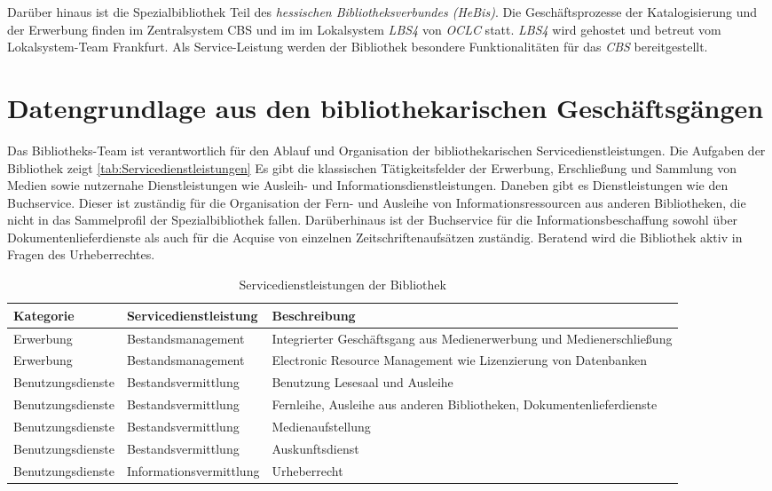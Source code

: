 Darüber hinaus ist die Spezialbibliothek Teil des \textit{hessischen Bibliotheksverbundes (HeBis)}. Die Geschäftsprozesse
der Katalogisierung und der Erwerbung finden im Zentralsystem \acrlong{CBS} und im im Lokalsystem \textit{LBS4} von
\textit{OCLC} statt. \textit{LBS4} wird gehostet und betreut vom Lokalsystem-Team Frankfurt. Als Service-Leistung werden der Bibliothek besondere Funktionalitäten
für das \textit{CBS} bereitgestellt.

\clearpage

\section{Datengrundlage aus den bibliothekarischen Geschäftsgängen}
Das Bibliotheks-Team ist verantwortlich für den Ablauf und Organisation der bibliothekarischen Servicedienstleistungen.
Die Aufgaben der Bibliothek zeigt \autoref{tab:Servicedienstleistungen}
Es gibt die klassischen Tätigkeitsfelder der Erwerbung, Erschließung und Sammlung von Medien sowie nutzernahe Dienstleistungen wie Ausleih- und Informationsdienstleistungen. 
Daneben gibt es Dienstleistungen wie den Buchservice. Dieser ist zuständig für die Organisation der Fern- und Ausleihe von Informationsressourcen aus anderen Bibliotheken, die nicht
in das Sammelprofil der Spezialbibliothek fallen. Darüberhinaus ist der Buchservice für die Informationsbeschaffung sowohl über Dokumentenlieferdienste als auch für die Acquise von einzelnen Zeitschriftenaufsätzen zuständig.
Beratend wird die Bibliothek aktiv in Fragen des Urheberrechtes. 

\begin{table}[h]
    \centering
    \begin{adjustbox}{max width=\textwidth}
    \begin{tabular}{lll}
       \toprule
       \textbf{Kategorie}& \textbf{Servicedienstleistung}& \textbf{Beschreibung}\\
       \midrule     
        Erwerbung                   &Bestandsmanagement      &Integrierter Geschäftsgang aus Medienerwerbung und Medienerschließung\\
        Erwerbung                   &Bestandsmanagement      &Electronic Resource Management wie Lizenzierung von Datenbanken\\
        Benutzungsdienste           &Bestandsvermittlung     &Benutzung Lesesaal und Ausleihe\\
        Benutzungsdienste           &Bestandsvermittlung     &Fernleihe, Ausleihe aus anderen Bibliotheken, Dokumentenlieferdienste\\
        Benutzungsdienste           &Bestandsvermittlung     &Medienaufstellung\\
        Benutzungsdienste           &Bestandsvermittlung     &Auskunftsdienst\\
        Benutzungsdienste           &Informationsvermittlung &Urheberrecht\\
       \bottomrule
    \end{tabular}
    \end{adjustbox}
    \caption{%
        Servicedienstleistungen der Bibliothek
    }
    \label{tab:Servicedienstleistungen}
    \end{table}

